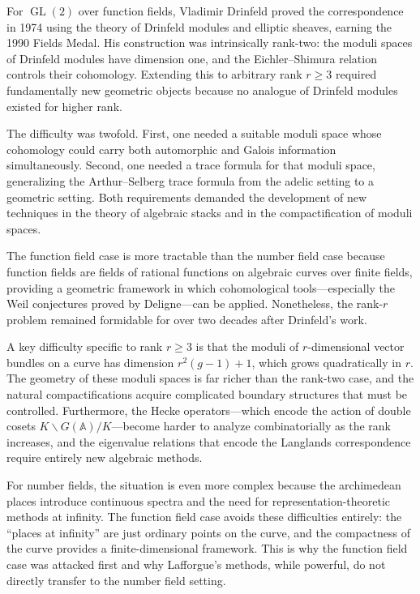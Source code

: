 For $\operatorname{GL}(2)$ over function fields, Vladimir Drinfeld proved the correspondence in 1974 using the theory of Drinfeld modules and elliptic sheaves, earning the 1990 Fields Medal. His construction was intrinsically rank-two: the moduli spaces of Drinfeld modules have dimension one, and the Eichler--Shimura relation controls their cohomology. Extending this to arbitrary rank $r \ge 3$ required fundamentally new geometric objects because no analogue of Drinfeld modules existed for higher rank.

The difficulty was twofold. First, one needed a suitable moduli space whose cohomology could carry both automorphic and Galois information simultaneously. Second, one needed a trace formula for that moduli space, generalizing the Arthur--Selberg trace formula from the adelic setting to a geometric setting. Both requirements demanded the development of new techniques in the theory of algebraic stacks and in the compactification of moduli spaces.

The function field case is more tractable than the number field case because function fields are fields of rational functions on algebraic curves over finite fields, providing a geometric framework in which cohomological tools---especially the Weil conjectures proved by Deligne---can be applied. Nonetheless, the rank-$r$ problem remained formidable for over two decades after Drinfeld's work.

A key difficulty specific to rank $r \ge 3$ is that the moduli of $r$-dimensional vector bundles on a curve has dimension $r^2(g-1)+1$, which grows quadratically in $r$. The geometry of these moduli spaces is far richer than the rank-two case, and the natural compactifications acquire complicated boundary structures that must be controlled. Furthermore, the Hecke operators---which encode the action of double cosets $K \backslash G(\mathbb{A}) / K$---become harder to analyze combinatorially as the rank increases, and the eigenvalue relations that encode the Langlands correspondence require entirely new algebraic methods.

For number fields, the situation is even more complex because the archimedean places introduce continuous spectra and the need for representation-theoretic methods at infinity. The function field case avoids these difficulties entirely: the ``places at infinity'' are just ordinary points on the curve, and the compactness of the curve provides a finite-dimensional framework. This is why the function field case was attacked first and why Lafforgue's methods, while powerful, do not directly transfer to the number field setting.

